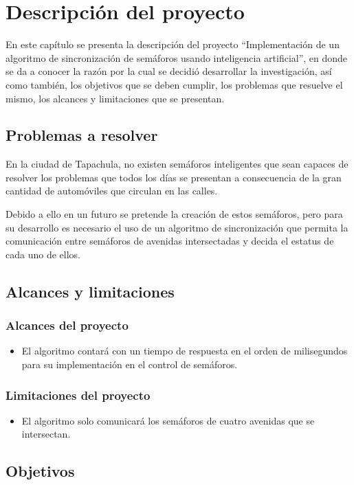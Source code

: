 \chapter{Descripción del proyecto}

En este capítulo se presenta la descripción del proyecto “Implementación de un algoritmo de sincronización de semáforos usando inteligencia artificial”, en donde se da a conocer la razón por la cual se decidió desarrollar la investigación, así como también, los objetivos que se deben cumplir, los problemas que resuelve el mismo, los alcances y limitaciones que se presentan.

\section{Problemas a resolver}
En la ciudad de Tapachula, no existen semáforos inteligentes que sean capaces de resolver los problemas que todos los días se presentan a consecuencia de la gran cantidad de automóviles que circulan en las calles.

Debido a ello en un futuro se pretende la creación de estos semáforos, pero para su desarrollo es necesario el uso de un algoritmo de sincronización que permita la comunicación entre semáforos de avenidas intersectadas y decida el estatus de cada uno de ellos.

\section{Alcances y limitaciones}
\subsection*{Alcances del proyecto}
\begin{itemize}
\item El algoritmo contará con un tiempo de respuesta en el orden de milisegundos para su implementación en el control de semáforos.
\end{itemize}

\subsection*{Limitaciones del proyecto}
\begin{itemize}
\item El algoritmo solo comunicará los semáforos de cuatro avenidas que se intersectan.
\end{itemize}

\section{Objetivos}

